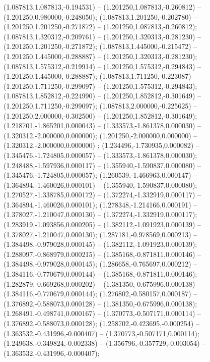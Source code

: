  (1.087813,1.087813,-0.194531) -- (1.201250,1.087813,-0.260812) -- (1.201250,0.980000,-0.248050);
 (1.087813,1.201250,-0.202780) -- (1.201250,1.201250,-0.271872) -- (1.201250,1.087813,-0.260812);
 (1.087813,1.320312,-0.209761) -- (1.201250,1.320313,-0.281230) -- (1.201250,1.201250,-0.271872);
 (1.087813,1.445000,-0.215472) -- (1.201250,1.445000,-0.288887) -- (1.201250,1.320313,-0.281230);
 (1.087813,1.575312,-0.219914) -- (1.201250,1.575312,-0.294843) -- (1.201250,1.445000,-0.288887);
 (1.087813,1.711250,-0.223087) -- (1.201250,1.711250,-0.299097) -- (1.201250,1.575312,-0.294843);
 (1.087813,1.852812,-0.224990) -- (1.201250,1.852812,-0.301649) -- (1.201250,1.711250,-0.299097);
 (1.087813,2.000000,-0.225625) -- (1.201250,2.000000,-0.302500) -- (1.201250,1.852812,-0.301649);
 (1.218701,-1.865201,0.000043) -- (1.333573,-1.861378,0.000030) -- (1.320312,-2.000000,0.000000);
 (1.201250,-2.000000,0.000000) -- (1.320312,-2.000000,0.000000) ;
 (1.234496,-1.730935,0.000082) -- (1.345476,-1.724805,0.000057) -- (1.333573,-1.861378,0.000030);
 (1.248488,-1.597936,0.000117) -- (1.355940,-1.590837,0.000080) -- (1.345476,-1.724805,0.000057);
 (1.260539,-1.466963,0.000147) -- (1.364894,-1.460026,0.000101) -- (1.355940,-1.590837,0.000080);
 (1.270527,-1.338785,0.000172) -- (1.372274,-1.332919,0.000117) -- (1.364894,-1.460026,0.000101);
 (1.278348,-1.214166,0.000191) -- (1.378027,-1.210047,0.000130) -- (1.372274,-1.332919,0.000117);
 (1.283919,-1.093856,0.000205) -- (1.382112,-1.091923,0.000139) -- (1.378027,-1.210047,0.000130);
 (1.287181,-0.978569,0.000213) -- (1.384498,-0.979028,0.000145) -- (1.382112,-1.091923,0.000139);
 (1.288097,-0.868979,0.000215) -- (1.385168,-0.871811,0.000146) -- (1.384498,-0.979028,0.000145);
 (1.286658,-0.765697,0.000212) -- (1.384116,-0.770679,0.000144) -- (1.385168,-0.871811,0.000146);
 (1.282879,-0.669268,0.000202) -- (1.381350,-0.675996,0.000138) -- (1.384116,-0.770679,0.000144);
 (1.276802,-0.580157,0.000187) -- (1.376892,-0.588073,0.000128) -- (1.381350,-0.675996,0.000138);
 (1.268491,-0.498741,0.000167) -- (1.370773,-0.507171,0.000114) -- (1.376892,-0.588073,0.000128);
 (1.258702,-0.423695,-0.000254) -- (1.363532,-0.431996,-0.000407) -- (1.370773,-0.507171,0.000114);
 (1.249638,-0.349824,-0.002338) -- (1.356796,-0.357729,-0.003054) -- (1.363532,-0.431996,-0.000407);
